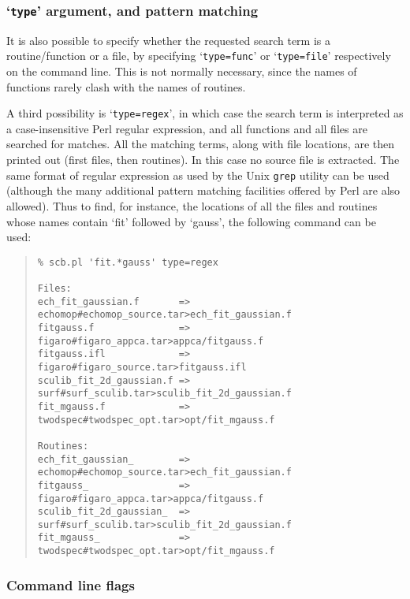 \documentclass[twoside,11pt]{article}
\renewcommand{\_}{\texttt{\symbol{95}}}
\begin{document}
\subsubsection{`{\tt type}' argument, and pattern matching}

It is also possible to specify whether the requested search
term is a routine/function or a file, by specifying `{\tt type=func}'
or `{\tt type=file}' respectively on the command line.  This is not
normally necessary, since the names of functions rarely clash with
the names of routines.

A third possibility is `{\tt type=regex}', in which case the 
search term is interpreted as a case-insensitive 
Perl regular expression, and
all functions and all files are searched for matches.
All the matching terms, along with file locations, are then printed out
(first files, then routines).
In this case no source file is extracted.
The same format of regular expression as used by the Unix {\tt grep}
utility can be used 
(although the many additional pattern matching facilities
offered by Perl are also allowed).
Thus to find, for instance, the locations of 
all the files and routines whose names contain `fit' followed
by `gauss', the following command can be used:
\begin{quote}
\begin{verbatim}
% scb.pl 'fit.*gauss' type=regex

Files:
ech_fit_gaussian.f       => echomop#echomop_source.tar>ech_fit_gaussian.f
fitgauss.f               => figaro#figaro_appca.tar>appca/fitgauss.f
fitgauss.ifl             => figaro#figaro_source.tar>fitgauss.ifl
sculib_fit_2d_gaussian.f => surf#surf_sculib.tar>sculib_fit_2d_gaussian.f
fit_mgauss.f             => twodspec#twodspec_opt.tar>opt/fit_mgauss.f

Routines:
ech_fit_gaussian_        => echomop#echomop_source.tar>ech_fit_gaussian.f
fitgauss_                => figaro#figaro_appca.tar>appca/fitgauss.f
sculib_fit_2d_gaussian_  => surf#surf_sculib.tar>sculib_fit_2d_gaussian.f
fit_mgauss_              => twodspec#twodspec_opt.tar>opt/fit_mgauss.f
\end{verbatim}
\end{quote}


\subsubsection{Command line flags}
\end{document}
